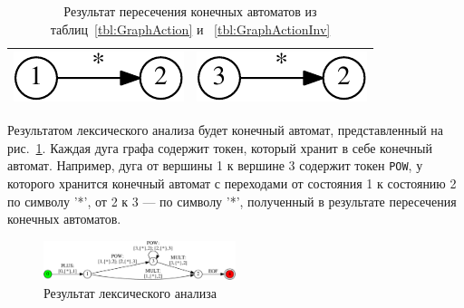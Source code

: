 \documentclass[10pt, conference, compsocconf]{IEEEtran}
\begin{document}
\begin{table}[h]
\begin{tabular}{ | c | c |}
    \begin{minipage}{.2\textwidth}
    \vspace{1 mm}
      \includegraphics[width=\linewidth]{pics/20_int}   
    \end{minipage}
    & 
    \begin{minipage}{.2\textwidth}
    \vspace{1 mm}
      \includegraphics[width=\linewidth]{pics/24_int}
    \end{minipage}
    \\ \hline
  \end{tabular}
  \caption{Результат пересечения конечных автоматов из таблиц~\ref{tbl:GraphAction} и ~\ref{tbl:GraphActionInv}}
  \label{tbl:GraphActionInters}
\end{table}

Результатом лексического анализа будет конечный автомат, представленный на рис.~\ref{fig:calc_ex_res}. Каждая дуга графа содержит токен, который хранит в себе конечный автомат. Например, дуга от вершины 1 к вершине 3 содержит токен \verb|POW|, у которого хранится конечный автомат с переходами от состояния 1 к состоянию 2 по символу '*', от 2 к 3 --- по символу '*', полученный в результате пересечения конечных автоматов. 

\begin{figure}[H]
\centering
\includegraphics[width=0.5\textwidth]{pics/calc_ex_res}
\caption{Результат лексического анализа }
\label{fig:calc_ex_res}
\end{figure}
\end{document}

